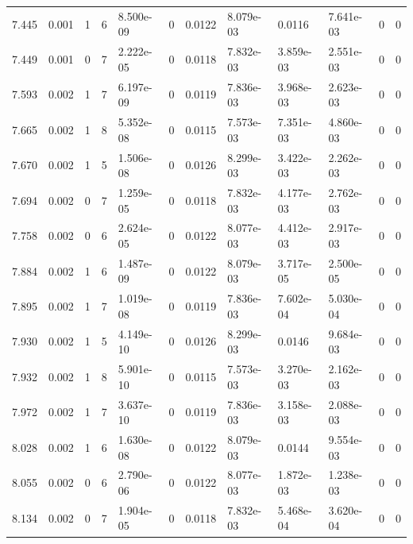 \documentclass[preview]{standalone}
\begin{document}
{{{{{\begin{tabular}{L{1.2cm}C{1.2cm} C{0.3cm}C{0.5cm} C{1.4cm}C{1.4cm} C{1.4cm}C{1.4cm} C{1.6cm}C{1.6cm} C{1.6cm}C{1.6cm}}
  7.445  &  0.001  & 1     &  6 &  8.500e-09  & 0  &  0.0122&   8.079e-03& 0.0116 & 7.641e-03   &  0 & 0  \\ 
  7.449  &  0.001  & 0     &  7 &  2.222e-05  & 0  &  0.0118&   7.832e-03& 3.859e-03 & 2.551e-03   &  0 & 0  \\ 
  7.593  &  0.002  & 1     &  7 &  6.197e-09  & 0  &  0.0119&   7.836e-03& 3.968e-03 & 2.623e-03   &  0 & 0  \\ 
  7.665  &  0.002  & 1     &  8 &  5.352e-08  & 0  &  0.0115&   7.573e-03& 7.351e-03 & 4.860e-03   &  0 & 0  \\ 
  7.670  &  0.002  & 1     &  5 &  1.506e-08  & 0  &  0.0126&   8.299e-03& 3.422e-03 & 2.262e-03   &  0 & 0  \\ 
  7.694  &  0.002  & 0     &  7 &  1.259e-05  & 0  &  0.0118&   7.832e-03& 4.177e-03 & 2.762e-03   &  0 & 0  \\ 
  7.758  &  0.002  & 0     &  6 &  2.624e-05  & 0  &  0.0122&   8.077e-03& 4.412e-03 & 2.917e-03   &  0 & 0  \\ 
  7.884  &  0.002  & 1     &  6 &  1.487e-09  & 0  &  0.0122&   8.079e-03& 3.717e-05 & 2.500e-05   &  0 & 0  \\ 
  7.895  &  0.002  & 1     &  7 &  1.019e-08  & 0  &  0.0119&   7.836e-03& 7.602e-04 & 5.030e-04   &  0 & 0  \\ 
  7.930  &  0.002  & 1     &  5 &  4.149e-10  & 0  &  0.0126&   8.299e-03& 0.0146 & 9.684e-03   &  0 & 0  \\ 
  7.932  &  0.002  & 1     &  8 &  5.901e-10  & 0  &  0.0115&   7.573e-03& 3.270e-03 & 2.162e-03   &  0 & 0  \\ 
  7.972  &  0.002  & 1     &  7 &  3.637e-10  & 0  &  0.0119&   7.836e-03& 3.158e-03 & 2.088e-03   &  0 & 0  \\ 
  8.028  &  0.002  & 1     &  6 &  1.630e-08  & 0  &  0.0122&   8.079e-03& 0.0144 & 9.554e-03   &  0 & 0  \\ 
  8.055  &  0.002  & 0     &  6 &  2.790e-06  & 0  &  0.0122&   8.077e-03& 1.872e-03 & 1.238e-03   &  0 & 0  \\ 
  8.134  &  0.002  & 0     &  7 &  1.904e-05  & 0  &  0.0118&   7.832e-03& 5.468e-04 & 3.620e-04   &  0 & 0  \\ 
\hline 
\end{tabular} 

}}}}}
\end{document}
